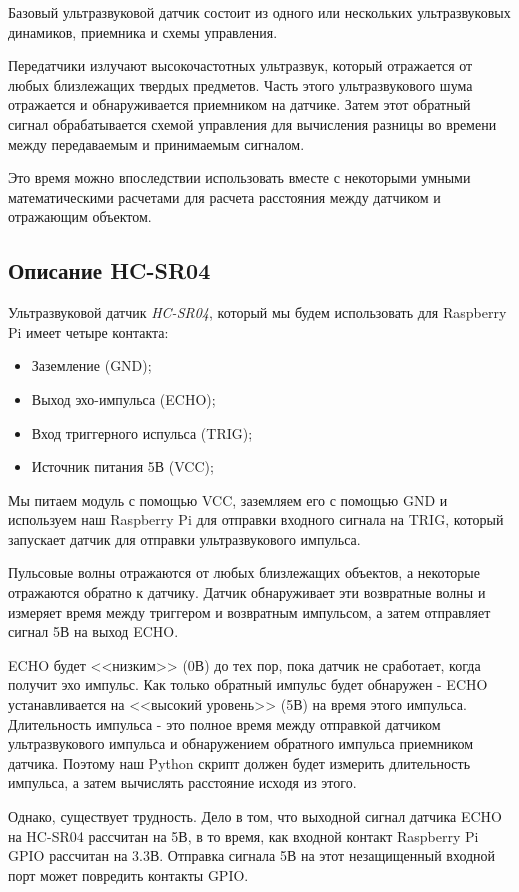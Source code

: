 \documentclass[a4paper, 14pt]{article}
\begin{document}
Базовый ультразвуковой датчик состоит из одного или нескольких ультразвуковых динамиков, приемника и схемы управления.

Передатчики излучают высокочастотных ультразвук, который отражается от любых близлежащих твердых предметов. Часть этого ультразвукового шума отражается и обнаруживается приемником на датчике. Затем этот обратный сигнал обрабатывается схемой управления для вычисления разницы во времени между передаваемым и принимаемым сигналом.

Это время можно впоследствии использовать вместе с некоторыми умными математическими расчетами для расчета расстояния между датчиком и отражающим объектом.

\subsection{Описание HC-SR04}

Ультразвуковой датчик \textit{HC-SR04}, который мы будем использовать для Raspberry Pi имеет четыре контакта:

\begin{itemize}
	\item Заземление (GND);
	\item Выход эхо-импульса (ECHO);
	\item Вход триггерного испульса (TRIG);
	\item Источник питания 5В (VCC);
\end{itemize}

Мы питаем модуль с помощью VCC, заземляем его с помощью GND и используем наш Raspberry Pi для отправки входного сигнала на TRIG, который запускает датчик для отправки ультразвукового импульса.

Пульсовые волны отражаются от любых близлежащих объектов, а некоторые отражаются обратно к датчику. Датчик обнаруживает эти возвратные волны и измеряет время между триггером и возвратным импульсом, а затем отправляет сигнал 5В на выход ECHO.

ECHO будет <<низким>> (0В) до тех пор, пока датчик не сработает, когда получит эхо импульс. Как только обратный импульс будет обнаружен - ECHO устанавливается на <<высокий уровень>> (5В) на время этого импульса. Длительность импульса - это полное время между отправкой датчиком ультразвукового импульса и обнаружением обратного импульса приемником датчика. Поэтому наш Python скрипт должен будет измерить длительность импульса, а затем вычислять расстояние исходя из этого.

Однако, существует трудность. Дело в том, что выходной сигнал датчика ECHO на HC-SR04 рассчитан на 5В, в то время, как входной контакт Raspberry Pi GPIO рассчитан на 3.3В. Отправка сигнала 5В на этот незащищенный входной порт может повредить контакты GPIO.
\end{document}
